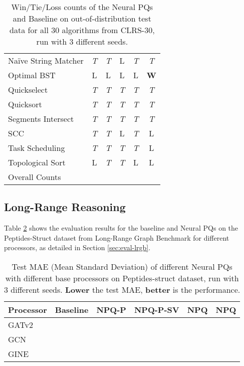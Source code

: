 \documentclass{article}
\theoremstyle{plain}
\theoremstyle{definition}
\theoremstyle{remark}
\begin{document}
\begin{table}[tbhp]
\begin{adjustwidth}{-2cm}{-2cm}
\begin{tabular}{lccccc}
    Na{\"i}ve String Matcher & \emph{T} & \emph{T} & L & \emph{T} & \emph{T} \\
    Optimal BST & L & L & L & L & \textbf{W} \\
    Quickselect & \emph{T} & \emph{T} & \emph{T} & \emph{T} & \emph{T} \\
    Quicksort & \emph{T} & \emph{T} & \emph{T} & \emph{T} & \emph{T} \\
    Segments Intersect & \emph{T} & \emph{T} & \emph{T} & \emph{T} & \emph{T} \\
    SCC & \emph{T} & \emph{T} & L & \emph{T} & L \\
    Task Scheduling & \emph{T} & \emph{T} & \emph{T} & \emph{T} & L \\
    Topological Sort & L & \emph{T} & \emph{T} & L & L \\
    \hline
    Overall Counts &  &  &  &  &  \\
    \hline
\end{tabular}
\caption[Win/Tie/Loss counts of the Neural PQs and Baseline on all algorithms from the CLRS-30 dataset]{Win/Tie/Loss counts of the Neural PQs and Baseline on out-of-distribution
         test data for all 30 algorithms from CLRS-30, run with 3 different seeds.}
\label{table:all-algs-best-large-win-tie-loss}
\end{adjustwidth}
\end{table}
\setlength{\tabcolsep}{6pt}

\subsection{Long-Range Reasoning}
Table \ref{table:lrgb} shows the evaluation results for the baseline and Neural PQs on the Peptides-Struct dataset from Long-Range Graph Benchmark
\citep{Dwivedi-Long-Range-Benchmark} for different processors, as detailed in Section \ref{sec:eval-lrgb}.

\setlength{\tabcolsep}{4pt}
\begin{table}[tbhp]
\begin{adjustwidth}{-2cm}{-2cm}
\centering
\captionsetup{margin=2cm}
\small
\begin{tabular}{lccccc}
    \hline
    \bfseries Processor & \bfseries Baseline & \bfseries NPQ-P & \bfseries NPQ-P-SV & \bfseries NPQ & \bfseries NPQ \\
    \hline
    GATv2 &  &  &  &  &  \\
    GCN &  &  &  &  &  \\
    GINE &  &  &  &  &  \\
    \hline
\end{tabular}
\caption[Evaluation results on Peptides-Struct data from the Long Range Graph Benchmark]{Test MAE (Mean  Standard Deviation) of different Neural PQs with
         different base processors on Peptides-struct dataset,
         run with 3 different seeds. \textbf{Lower} the test MAE, \textbf{better} is the performance.}
\label{table:lrgb}
\end{adjustwidth}
\end{table}
\setlength{\tabcolsep}{6pt}
\end{document}
